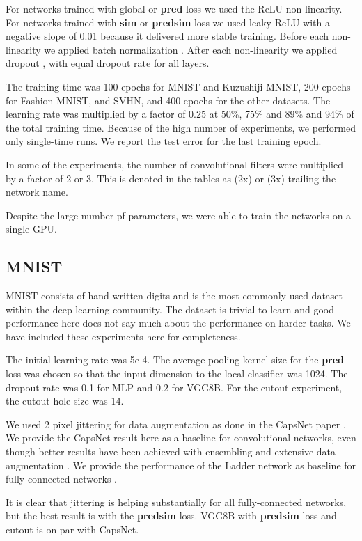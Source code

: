 \documentclass{article}
\begin{document}
For networks trained with global or \textbf{pred} loss we used the ReLU non-linearity. For networks trained with \textbf{sim} or \textbf{predsim} loss we used leaky-ReLU with a negative slope of 0.01 \cite{Maas13} because it delivered more stable training.  Before each non-linearity we applied batch normalization \cite{IoffeS15}. After each non-linearity we applied dropout \cite{SrivastavaHKSS14}, with equal dropout rate for all layers.

The training time was 100 epochs for MNIST and Kuzushiji-MNIST, 200 epochs for Fashion-MNIST, and SVHN, and 400 epochs for the other datasets. The learning rate was multiplied by a factor of 0.25 at 50\%, 75\% and 89\% and 94\% of the total training time. Because of the high number of experiments, we performed only single-time runs. We report the test error for the last training epoch.

In some of the experiments, the number of convolutional filters were multiplied by a factor of 2 or 3. This is denoted in the tables as (2x) or (3x) trailing the network name. 

Despite the large number pf parameters, we were able to train the networks on a single GPU.

\subsection{MNIST}

MNIST consists of hand-written digits and is the most commonly used dataset within the deep learning community. The dataset is trivial to learn and good performance here does not say much about the performance on harder tasks. We have included these experiments here for completeness. 

The initial learning rate was 5e-4. The average-pooling kernel size for the \textbf{pred} loss was chosen so that the input dimension to the local classifier was 1024. The dropout rate was 0.1 for MLP and 0.2 for VGG8B. For the cutout experiment, the cutout hole size was 14.

We used 2 pixel jittering for data augmentation as done in the CapsNet paper \cite{SabourFH17}. We provide the CapsNet result here as a baseline for convolutional networks, even though better results have been achieved with ensembling and extensive data augmentation \cite{WanZZLF13}. We provide the performance of the Ladder network as baseline for fully-connected networks \cite{RasmusBHVR15}.

It is clear that jittering is helping substantially for all fully-connected networks, but the best result is with the \textbf{predsim} loss. VGG8B with \textbf{predsim} loss and cutout is on par with CapsNet.
\end{document}
